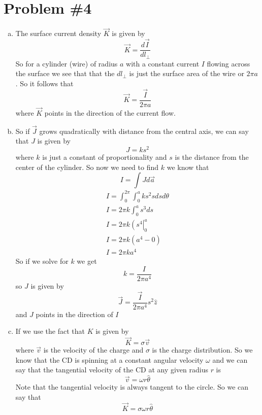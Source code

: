 \documentclass[11pt]{article}
\numberwithin{equation}{section}
\begin{document}
\section{Problem \#4}
\begin{enumerate}[(a)]
\item
The surface current density $\vec{K}$ is given by 
$$\vec{K} = \frac{d\vec{I}}{dl_{\perp}}$$
So for a cylinder (wire) of radius $a$ with a constant current $I$ flowing across the surface we see that that the $dl_{\perp}$ is just the surface area of the wire or $2\pi a$. So it follows that
$$\vec{K} = \frac{\vec{I}}{2\pi a}$$
where $\vec{K}$ points in the direction of the current flow.

\item
So if $\vec{J}$ grows quadratically with distance from the central axis, we can say that $J$ is given by
$$J=ks^2$$
where $k$ is just a constant of proportionality and $s$ is the distance from the center of the cylinder. So now we need to find $k$ we know that 
$$I= \int J d\vec{a}$$
\begin{align*}
I= \int_0^{2\pi}\int_0^a ks^2 sdsd\theta\\
I= 2\pi k \int_0^a s^3 ds\\
I= 2\pi k \left(s^4\right|_0^a  \\
I= 2\pi k \left(a^4-0\right)  \\
I= 2\pi k a^4
\end{align*}
So if we solve for $k$ we get
$$k =\frac{I}{2\pi a^4}$$
so $J$ is given by
$$\vec{J}=\frac{\vec{I}}{2\pi a^4}s^2\hat{z}$$
and $J$ points in the direction of $I$

\item
If we use the fact that $K$ is given by
$$\vec{K} = \sigma \vec{v}$$
where $\vec{v}$ is the velocity of the charge and $\sigma$ is the charge distribution. So we know that the CD is spinning at a constant angular velocity $\omega$ and we can say that the tangential velocity of the CD at any given radius $r$ is 
$$\vec{v} = \omega r\hat{\theta}$$
Note that the tangential velocity is always tangent to the circle. So we can say that
$$\vec{K} = \sigma\omega r\hat{\theta}$$


\end{enumerate}
\end{document}
